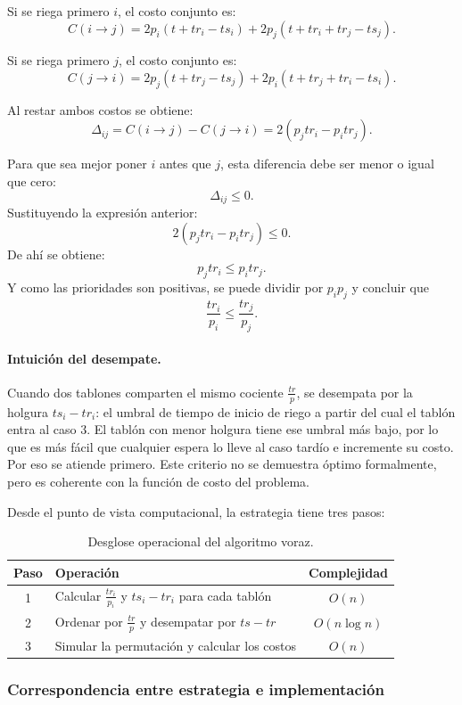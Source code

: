 \documentclass[12pt,a4paper]{article}
\begin{document}
Si se riega primero \(i\), el costo conjunto es:
\[
C(i\rightarrow j)=2p_i(t+tr_i-ts_i)+2p_j(t+tr_i+tr_j-ts_j).
\]

Si se riega primero \(j\), el costo conjunto es:
\[
C(j\rightarrow i)=2p_j(t+tr_j-ts_j)+2p_i(t+tr_j+tr_i-ts_i).
\]

Al restar ambos costos se obtiene:
\[
\Delta_{ij}=C(i\rightarrow j)-C(j\rightarrow i)=2(p_jtr_i-p_itr_j).
\]

Para que sea mejor poner \(i\) antes que \(j\), esta diferencia debe ser menor o igual que cero:
\[
\Delta_{ij}\le 0.
\]
Sustituyendo la expresi\'on anterior:
\[
2(p_jtr_i-p_itr_j)\le 0.
\]
De ah\'i se obtiene:
\[
p_jtr_i\le p_itr_j.
\]
Y como las prioridades son positivas, se puede dividir por \(p_ip_j\) y concluir que
\[
\frac{tr_i}{p_i}\leq \frac{tr_j}{p_j}.
\]

\paragraph{Intuici\'on del desempate.}
Cuando dos tablones comparten el mismo cociente $\frac{tr}{p}$, se desempata por la 
holgura $ts_i - tr_i$: el umbral de tiempo de inicio de riego a partir del cual 
el tabl\'on entra al caso 3. El tabl\'on con menor holgura tiene ese umbral m\'as 
bajo, por lo que es m\'as f\'acil que cualquier espera lo lleve al caso tard\'io 
e incremente su costo. Por eso se atiende primero. Este criterio no se demuestra 
\'optimo formalmente, pero es coherente con la funci\'on de costo del problema.

Desde el punto de vista computacional, la estrategia tiene tres pasos:

\begin{table}[H]
  \centering
  \begin{tabular}{clc}
    \toprule
    Paso & Operaci\'on & Complejidad \\
    \midrule
    1 & Calcular \(\frac{tr_i}{p_i}\) y \(ts_i-tr_i\) para cada tabl\'on & \(O(n)\) \\
    2 & Ordenar por \(\frac{tr}{p}\) y desempatar por \(ts-tr\) & \(O(n\log n)\) \\
    3 & Simular la permutaci\'on y calcular los costos & \(O(n)\) \\
    \bottomrule
  \end{tabular}
  \caption{Desglose operacional del algoritmo voraz.}
\end{table}

\subsubsection{Correspondencia entre estrategia e implementaci\'on}
\end{document}
